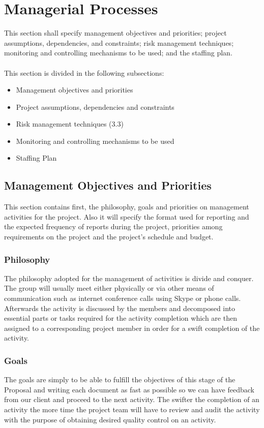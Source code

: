 \documentclass[12pt]{article}
\begin{document}
\section{Managerial Processes}
This section shall specify management objectives and priorities; project assumptions, dependencies, and constraints; risk management techniques; monitoring and controlling mechanisms to be used; and the staffing plan.\\\\
This section is divided in the following subsections:
\begin{itemize}
  \item Management objectives and priorities 
  \item Project assumptions, dependencies and constraints 
  \item Risk management techniques (3.3)
  \item Monitoring and controlling mechanisms to be used 
  \item Staffing Plan 
\end{itemize}

\subsection{Management Objectives and Priorities}
This section contains first, the philosophy, goals and priorities on management activities for the project. Also it will specify the format used for reporting and the expected frequency of reports during the project, priorities among requirements on the project and the project’s schedule and budget.

\subsubsection{Philosophy}
The philosophy adopted for the management of activities is divide and conquer. The group will usually meet either physically or via other means of communication such as internet conference calls using Skype or phone calls. Afterwards the activity is discussed by the members and decomposed into essential parts or tasks required for the activity completion which are then assigned to a corresponding project member in order for a swift completion of the activity.

\subsubsection{Goals}
The goals are simply to be able to fulfill the objectives of this stage of the Proposal and writing each document as fast as possible so we can have feedback from our client and proceed to the next activity. The swifter the completion of an activity the more time the project team will have to review and audit the activity with the purpose of obtaining desired quality control on an activity.
\end{document}
